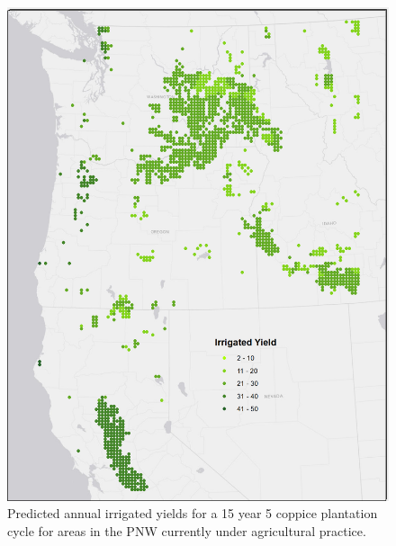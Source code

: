 \documentclass[preprint,12pt]{elsarticle}
\begin{document}
\begin{figure}[hp]
  \centering
  \includegraphics[width=1.0\linewidth]{irrigated_yield}
  \caption{Predicted annual irrigated yields for a 15 year 5 coppice plantation cycle for areas in the \ac{PNW} currently under agricultural practice.}
  \label{fig:irrigated_yield}
\end{figure}
\end{document}
